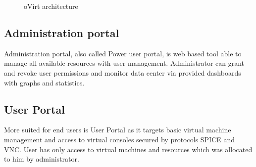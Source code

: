 \begin{figure}[h]
\caption{oVirt architecture \cite{oVirtImg}}
\label{ovirt_architecture}
\end{figure}

\subsection{Administration portal}
Administration portal, also called Power user portal, is web based tool able to manage all available resources with user management. Administrator can grant and revoke user permissions and monitor data center via provided dashboards with graphs and statistics. 

\subsection{User Portal}\label{userportal}
More suited for end users is User Portal as it targets basic virtual machine management and access to virtual consoles secured by protocols SPICE\cite{SPICE} and VNC\cite{VNC}. User has only access to virtual machines and resources which was allocated to him by administrator.

